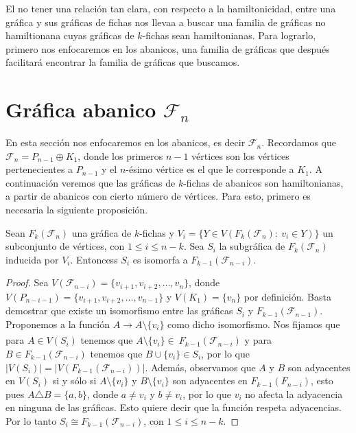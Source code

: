 El no tener una relaci\'on tan clara, con respecto a la hamiltonicidad, entre
una gr\'afica y sus gr\'aficas de fichas nos llevaa a buscar una familia de
gr\'aficas no hamiltionana cuyas gr\'aficas de $k$-fichas sean hamiltonianas.
Para lograrlo, primero nos enfocaremos en los abanicos, una familia de
gr\'aficas que despu\'es facilitar\'a encontrar la familia de gr\'aficas que
buscamos.

\section{Gr\'afica abanico \texorpdfstring{$\mathcal{F}_n$}{Fn}}%
\label{sec:SimpleFan}

En esta secci\'on nos enfocaremos en los abanicos, es decir $\mathcal{F}_n$.
Recordamos que $\mathcal{F}_n = P_{n-1} \oplus K_1$, donde los primeros $n-1$
v\'ertices son los v\'ertices pertenecientes a $P_{n-1}$ y el $n$-\'esimo
v\'ertice es el que le corresponde a $K_1$. A continuaci\'on veremos que las
gr\'aficas de $k$-fichas de abanicos son hamiltonianas, a partir de abanicos con
cierto n\'umero de v\'ertices. Para esto, primero es necesaria la siguiente
proposici\'on.

\begin{proposicion}
\label{prop:iso-SFan}
    Sean $F_k(\mathcal{F}_n)$ una gr\'afica de $k$-fichas y $V_i=\{ Y \in
    V(F_k(\mathcal{F}_n) \colon\ v_i \in Y) \}$ un subconjunto de v\'ertices,
    con $1 \leq i \leq n-k$. Sea $S_i$ la subgr\'afica de $F_k(\mathcal{F}_n)$
    inducida  por $V_i$. Entoncess $S_i$ es isomorfa a
    $F_{k-1}(\mathcal{F}_{n-i})$.
\end{proposicion}
    
\begin{proof}
    Sea $V(\mathcal{F}_{n-i}) = \{v_{i+1}, v_{i+2}, \dots, v_n\}$, donde
    $V(P_{n-i-1}) = \{v_{i+1}, v_{i+2}, \dots, v_{n-1}\}$ y $V(K_1)= \{v_n\}$
    por definici\'on. Basta demostrar que existe un isomorfismo entre las
    gr\'aficas $S_i$ y $F_{k-1}(\mathcal{F}_{n-1})$. Proponemos a la funci\'on
    $A \xrightarrow[]{} A \setminus \{v_i\}$ como dicho isomorfismo. Nos fijamos
    que para $A \in V(S_i)$ tenemos que $A \setminus \{v_i\} \in \
    F_{k-1}(\mathcal{F}_{n-i})$  y para $B \in F_{k-1}(\mathcal{F}_{n-i})$
    tenemos que $B \cup \{v_i\} \in S_i$, por lo que
    $|V(S_i)|=|V(F_{k-1}(\mathcal{F}_{n-i}))|$. Adem\'as, observamos que $A$ y
    $B $ son adyacentes en $V(S_i)$ si y s\'olo si $A \setminus \{v_i\}$ y $B
    \setminus \{v_i\}$ son adyacentes en $F_{k-1}(F_{n-i})$, esto pues
    $A\triangle B = \{a,b\}$, donde $a\neq v_i$ y $b \neq v_i$, por lo que $v_i$
    no afecta la adyacencia en ninguna de las gr\'aficas. Esto quiere decir que
    la funci\'on respeta adyacencias. Por lo tanto $S_i \cong
    F_{k-1}(\mathcal{F}_{n-i})$, con $1 \leq i \leq n-k$.
\end{proof}

